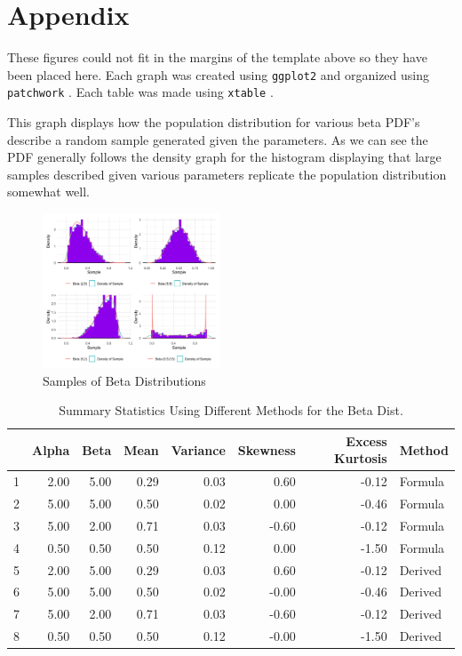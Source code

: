 \documentclass{article}\usepackage[]{graphicx}\usepackage[]{xcolor}
\begin{document}
\newpage
\onecolumn
\section{Appendix}


These figures could not fit in the margins of the template above so they have been placed here. Each graph was created using \texttt{ggplot2} and organized using \texttt{patchwork} \citep{ggplot} \citep{patchwork}. Each table was made using \texttt{xtable} \citep{xtable}. 

This graph displays how the population distribution for various beta PDF's describe a random sample generated given the parameters. As we can see the PDF generally follows the density graph for the histogram displaying that large samples described given various parameters replicate the population distribution somewhat well. 

\begin{figure}[H]
\centering
\includegraphics[width=0.47\textwidth]{SampDist}  %
\caption{Samples of Beta Distributions}
\label{Figure 2}
\end{figure}

\begin{table}[ht]
\centering
\begin{tabular}{rrrrrrrl}
\hline
& Alpha & Beta & Mean & Variance & Skewness & Excess Kurtosis & Method \\ 
\hline
1 & 2.00 & 5.00 & 0.29 & 0.03 & 0.60 & -0.12 & Formula \\ 
2 & 5.00 & 5.00 & 0.50 & 0.02 & 0.00 & -0.46 & Formula \\ 
3 & 5.00 & 2.00 & 0.71 & 0.03 & -0.60 & -0.12 & Formula \\ 
4 & 0.50 & 0.50 & 0.50 & 0.12 & 0.00 & -1.50 & Formula \\ 
5 & 2.00 & 5.00 & 0.29 & 0.03 & 0.60 & -0.12 & Derived \\ 
6 & 5.00 & 5.00 & 0.50 & 0.02 & -0.00 & -0.46 & Derived \\ 
7 & 5.00 & 2.00 & 0.71 & 0.03 & -0.60 & -0.12 & Derived \\ 
8 & 0.50 & 0.50 & 0.50 & 0.12 & -0.00 & -1.50 & Derived \\ 
\hline
\end{tabular}
\caption{Summary Statistics Using Different Methods for the Beta Dist.}
\label{Table 1}
\end{table}
\end{document}
